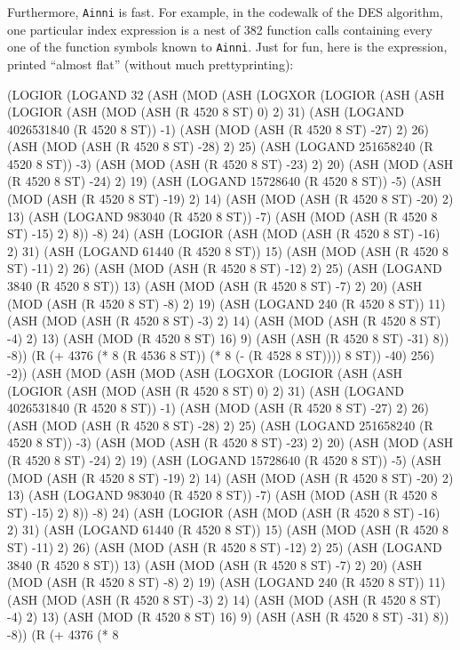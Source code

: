 \documentclass[submission,copyright,creativecommons]{eptcs}
\newcommand{\ptt}[1]{\tt{#1}}
\begin{document}
Furthermore, {\ptt{Ainni}} is fast.  For example, in the codewalk of the DES algorithm,
one particular index expression is a nest of 382 function calls containing
every one of the function symbols known to {\ptt{Ainni}}.  Just for fun, here is
the expression, printed ``almost flat'' (without much prettyprinting):
\vspace{0.5em}
\begin{acl2p}{\tiny{
(LOGIOR
  (LOGAND 32 (ASH (MOD (ASH (LOGXOR (LOGIOR (ASH (ASH (LOGIOR (ASH (MOD (ASH (R 4520 8 ST) 0) 2) 31) (ASH (LOGAND 4026531840
    (R 4520 8 ST)) -1) (ASH (MOD (ASH (R 4520 8 ST) -27) 2) 26) (ASH (MOD (ASH (R 4520 8 ST) -28) 2) 25) (ASH (LOGAND 251658240 (R 4520
    8 ST)) -3) (ASH (MOD (ASH (R 4520 8 ST) -23) 2) 20) (ASH (MOD (ASH (R 4520 8 ST) -24) 2) 19) (ASH (LOGAND 15728640 (R 4520 8 ST))
    -5) (ASH (MOD (ASH (R 4520 8 ST) -19) 2) 14) (ASH (MOD (ASH (R 4520 8 ST) -20) 2) 13) (ASH (LOGAND 983040 (R 4520 8 ST)) -7) (ASH
    (MOD (ASH (R 4520 8 ST) -15) 2) 8)) -8) 24) (ASH (LOGIOR (ASH (MOD (ASH (R 4520 8 ST) -16) 2) 31) (ASH (LOGAND 61440 (R 4520 8 ST))
    15) (ASH (MOD (ASH (R 4520 8 ST) -11) 2) 26) (ASH (MOD (ASH (R 4520 8 ST) -12) 2) 25) (ASH (LOGAND 3840 (R 4520 8 ST)) 13) (ASH (MOD
    (ASH (R 4520 8 ST) -7) 2) 20) (ASH (MOD (ASH (R 4520 8 ST) -8) 2) 19) (ASH (LOGAND 240 (R 4520 8 ST)) 11) (ASH (MOD (ASH (R 4520 8
    ST) -3) 2) 14) (ASH (MOD (ASH (R 4520 8 ST) -4) 2) 13) (ASH (MOD (R 4520 8 ST) 16) 9) (ASH (ASH (R 4520 8 ST) -31) 8)) -8)) (R (+
    4376 (* 8 (R 4536 8 ST)) (* 8 (- (R 4528 8 ST)))) 8 ST)) -40) 256) -2))
  (ASH (MOD (ASH (MOD (ASH (LOGXOR (LOGIOR (ASH (ASH (LOGIOR (ASH (MOD (ASH (R 4520 8 ST) 0) 2) 31) (ASH (LOGAND 4026531840 (R 4520
    8 ST)) -1) (ASH (MOD (ASH (R 4520 8 ST) -27) 2) 26) (ASH (MOD (ASH (R 4520 8 ST) -28) 2) 25) (ASH (LOGAND 251658240 (R 4520 8 ST))
    -3) (ASH (MOD (ASH (R 4520 8 ST) -23) 2) 20) (ASH (MOD (ASH (R 4520 8 ST) -24) 2) 19) (ASH (LOGAND 15728640 (R 4520 8 ST)) -5) (ASH
    (MOD (ASH (R 4520 8 ST) -19) 2) 14) (ASH (MOD (ASH (R 4520 8 ST) -20) 2) 13) (ASH (LOGAND 983040 (R 4520 8 ST)) -7) (ASH (MOD (ASH
    (R 4520 8 ST) -15) 2) 8)) -8) 24) (ASH (LOGIOR (ASH (MOD (ASH (R 4520 8 ST) -16) 2) 31) (ASH (LOGAND 61440 (R 4520 8 ST)) 15) (ASH
    (MOD (ASH (R 4520 8 ST) -11) 2) 26) (ASH (MOD (ASH (R 4520 8 ST) -12) 2) 25) (ASH (LOGAND 3840 (R 4520 8 ST)) 13) (ASH (MOD (ASH (R
    4520 8 ST) -7) 2) 20) (ASH (MOD (ASH (R 4520 8 ST) -8) 2) 19) (ASH (LOGAND 240 (R 4520 8 ST)) 11) (ASH (MOD (ASH (R 4520 8 ST) -3)
    2) 14) (ASH (MOD (ASH (R 4520 8 ST) -4) 2) 13) (ASH (MOD (R 4520 8 ST) 16) 9) (ASH (ASH (R 4520 8 ST) -31) 8)) -8)) (R (+ 4376 (* 8
}}
\end{acl2p}
\end{document}
